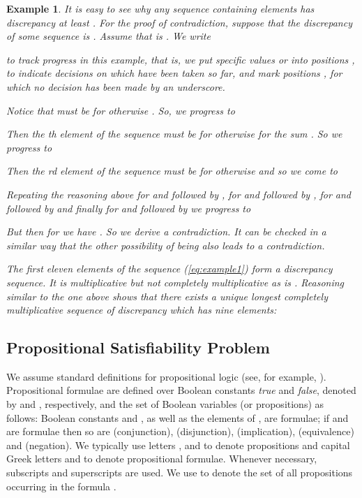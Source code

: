 \documentclass{article} \usepackage[utf8]{inputenc}
\newtheorem{example}[theorem]{Example}
\begin{document}
\begin{example}\label{ex:edp1}
It is easy to see why any  sequence containing  elements has
discrepancy at least . For the proof of contradiction, suppose that 
the discrepancy of some  sequence  is . 
Assume that  is .  
We write 

to track progress in this example, that is,  we put specific values 
 or  into positions , to indicate decisions on 
which have been taken so far, and mark positions , for which no decision has 
been made by an underscore.

Notice that  must be  for otherwise . So, we progress to

Then the th element of the sequence must be  for otherwise 
for  the sum . So we progress to

Then the rd element of the sequence must be  for otherwise  and
so we come to

Repeating the reasoning above for 
 and  followed by ,
for  and  followed by , 
for  and  followed by 
and finally for  and  followed by  we progress to

But then for  we have . 
So we derive a contradiction.
It can be checked  in a similar way that the other possibility of  being
 also leads to a contradiction.

The first eleven elements of the sequence (\ref{eq:example1}) form a discrepancy  sequence.
It is multiplicative but not completely multiplicative as   is .
Reasoning similar to the one above shows that there
exists a unique longest completely multiplicative  sequence of
discrepancy  which has nine elements:

\end{example}

\subsection{Propositional Satisfiability Problem}
We assume standard definitions for propositional logic (see, for example,
\cite{rautenberg}).  Propositional formulae are defined over Boolean constants
\emph{true} and \emph{false}, denoted by  and , respectively, and the set
of Boolean variables (or propositions)  as follows: Boolean constants 
and , as well as the elements of , are formulae; if  and 
are formulae then so are  (conjunction), 
(disjunction),  (implication), 
(equivalence) and  (negation).  We
typically use letters ,  and  to denote propositions and 
capital Greek letters  and  to denote propositional formulae. Whenever
necessary, subscripts and superscripts are used. We use  to denote
the set of all propositions occurring in the formula .
\end{document}
